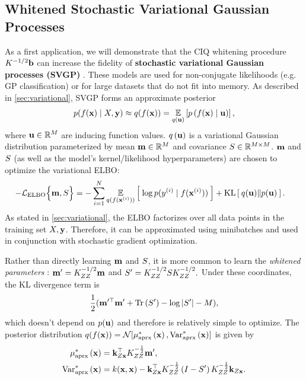 \subsection{Whitened Stochastic Variational Gaussian Processes}
\label{sec:variational_results}

As a first application, we will demonstrate that the CIQ whitening procedure $K^{-1/2} \mathbf{b}$ can increase the fidelity of {\bf stochastic variational Gaussian processes (SVGP)} \cite{hensman2013gaussian,hensman2015scalable,matthews2017scalable}.
%
These models are used for non-conjugate likelihoods (e.g. GP classification) or for large datasets that do not fit into memory.
As described in \cref{sec:variational}, SVGP forms an approximate posterior
\[
  p(f(\mathbf{x}) \mid X, \mathbf{y}) \approx q(f(\mathbf{x})) = \operatorname*{\mathbb{E}}_{q(\mathbf{u})} \left[  p\left( f(\mathbf{x}) \mid \mathbf{u} \right) \right],
\]
where $\mathbf{u} \in \mathbb{R}^M$ are {inducing function values}.
$q \left( \mathbf{u} \right)$ is a variational Gaussian distribution parameterized by mean $\mathbf{m} \in \mathbb{R}^M$ and covariance $S \in \mathbb{R}^{M \times M}$.
$\mathbf{m}$ and $S$ (as well as the model's kernel/likelihood hyperparameters) are chosen to optimize the variational ELBO:
%
\begin{align*}
  -\mathcal L_\text{ELBO}\Bigl\{ \mathbf{m}, S \Bigr\} &= -\sum_{i=1}^N \operatorname*{\mathbb{E}}_{q(f(\mathbf{x}^{(i)}))} \left[   \: \log p( y^{(i)} \mid f(\mathbf{x}^{(i)}) ) \:  \right] + \operatorname*{KL} \left[ \:  q(\mathbf{u})  \Vert  p(\mathbf{u})  \: \right].
\end{align*}
As stated in \cref{sec:variational}, the ELBO factorizes over all data points in the training set $X, \mathbf{y}$.
Therefore, it can be approximated using minibatches and used in conjunction with stochastic gradient optimization.

Rather than directly learning $\mathbf{m}$ and $S$, it is more common to learn the \emph{whitened parameters} \cite{kuss2005assessing,matthews2017scalable}:
$ \mathbf{m}' = K_{ZZ}^{- 1/ 2} \mathbf{m}$ and $S' = K_{ZZ}^{-1 / 2} S K_{ZZ}^{-1 / 2}. $
Under these coordinates, the KL divergence term is
\[ \frac{1}{2} ( \bmm^{\prime \top} \bmm' + \tr{ \bS' } - \log \vert \bS' \vert - M ),\]
%
which doesn't depend on $p(\mathbf{u})$ and therefore is relatively simple to optimize.
The posterior distribution $q(f(\bx)) = \normaldist{\ameantest{\bx}}{\avartest{\bx}}$ is given by
%
\begin{equation}
  \begin{split}
  \mu^*_\text{aprx} \left( \mathbf{x} \right) &= \mathbf{k}_{Z\mathbf{x}}^\top K_{ZZ}^{-\frac 1 2} \mathbf{m}',
  \\
  \text{Var}^*_\text{aprx} \left( \mathbf{x} \right) &= k(\mathbf{x}, \mathbf{x}) -
    \mathbf{k}_{Z\mathbf{x}}^\top K_{ZZ}^{-\frac 1 2} \left( I - S' \right) K_{ZZ}^{-\frac 1 2} \mathbf{k}_{Z\mathbf{x}}.
  \end{split}
  \label{eqn:approx_pred_dist}
\end{equation}


